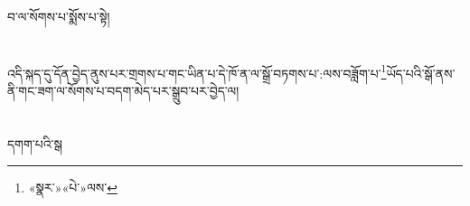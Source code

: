 བ་ལ་སོགས་པ་སྨོས་པ་སྟེ།\chapter{ }འདི་སྐད་དུ་དོན་བྱེད་ནུས་པར་གྲགས་པ་གང་ཡིན་པ་དེ་ཁོ་ན་ལ་སྒྲོ་བཏགས་པ་:ལས་བཟློག་པ་\footnote{«སྣར་»«པེ་»ལས་}ཡོད་པའི་སྒོ་ནས་ནི་གང་ཟག་ལ་སོགས་པ་བདག་མེད་པར་སྒྲུབ་པར་བྱེད་ལ།\chapter{ }དགག་པའི་སྒ
